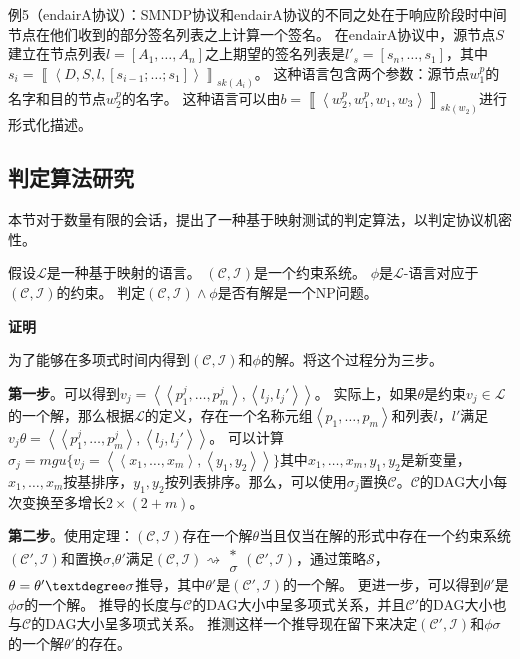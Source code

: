 例5（endairA协议）：SMNDP协议和endairA协议的不同之处在于响应阶段时中间节点在他们收到的部分签名列表之上计算一个签名。
在endairA协议中，源节点$S$建立在节点列表$l=\left[A_{1},\ldots,A_{n}\right]$之上期望的签名列表是$l'_s=\left[s_{n},\ldots,s_{1}\right]$，其中$s_{i}=\left\llbracket \left\langle D,S,l,[s_{i-1};\ldots;s_{1}]\right\rangle \right\rrbracket _{sk(A_{i})}$。
这种语言包含两个参数：源节点$w_1^p$的名字和目的节点$w_2^p$的名字。
这种语言可以由$b=\left\llbracket \left\langle w_2^p,w_1^p,w_1,w_3\right\rangle \right\rrbracket _{sk(w_{2})}$进行形式化描述。

\subsection{判定算法研究}
本节对于数量有限的会话，提出了一种基于映射测试的判定算法，以判定协议机密性。

\begin{theorm}
假设$\mathcal{L}$是一种基于映射的语言。
$(\mathcal{C},\mathcal{I})$是一个约束系统。
$\phi$是$\mathcal{L}$-语言对应于$(\mathcal{C},\mathcal{I})$的约束。
判定$(\mathcal{C},\mathcal{I})\wedge\phi$是否有解是一个NP问题。
\label{theorm-decision}
\end{theorm}

\textbf{证明}

为了能够在多项式时间内得到$(\mathcal{C},\mathcal{I})$和$\phi$的解。将这个过程分为三步。

\textbf{第一步}。可以得到$v_{j}=\left\langle \left\langle p_{1}^{j},\ldots,p_{m}^{j}\right\rangle ,\left\langle l_{j},l_{j}'\right\rangle \right\rangle $。
实际上，如果$\theta$是约束$v_j\in \mathcal{L}$的一个解，那么根据$\mathcal{L}$的定义，存在一个名称元组$\left\langle p_{1},\ldots,p_{m}\right\rangle$和列表$l$，$l'$满足$v_{j}\theta=\left\langle \left\langle p_{1}^{j},\ldots,p_{m}^{j}\right\rangle ,\left\langle l_{j},l_{j}'\right\rangle \right\rangle $。
可以计算$\sigma_{j}=mgu\{v_{j}=\left\langle \left\langle x_{1},\ldots,x_{m}\right\rangle ,\left\langle y_{1},y_{2}\right\rangle \right\rangle \}$其中$x_1,\ldots,x_m,y_1,y_2$是新变量，$x_1,\ldots,x_m$按基排序，$y_1,y_2$按列表排序。那么，可以使用$\sigma_j$置换$\mathcal{C}$。$\mathcal{C}$的DAG大小每次变换至多增长$2\times (2+m)$。

\textbf{第二步}。使用定理：$(\mathcal{C},\mathcal{I})$存在一个解$\theta$当且仅当在解的形式中存在一个约束系统$(\mathcal{C'},\mathcal{I})$和置换$\sigma$,$\theta'$满足$(\mathcal{C},\mathcal{I})\rightsquigarrow\begin{array}{c}
\ast\\
\sigma
\end{array}(\mathcal{C'},\mathcal{I})$，通过策略$\mathcal{S}$，$\theta=\theta'\textdegree \sigma$推导，其中$\theta'$是$(\mathcal{C'},\mathcal{I})$的一个解。
更进一步，可以得到$\theta'$是$\phi\sigma$的一个解。
推导的长度与$\mathcal{C}$的DAG大小中呈多项式关系，并且$\mathcal{C'}$的DAG大小也与$\mathcal{C}$的DAG大小呈多项式关系。
推测这样一个推导现在留下来决定$(\mathcal{C'},\mathcal{I})$和$\phi \sigma$的一个解$\theta'$的存在。


